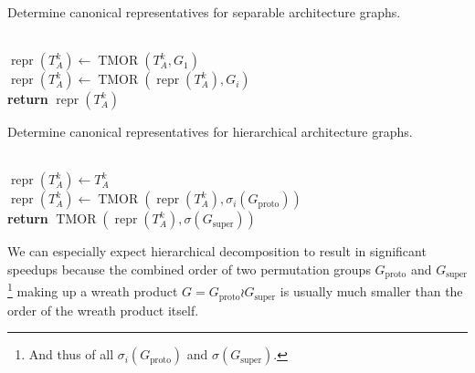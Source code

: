 \begin{algorithm}
  \caption{Determine canonical representatives for separable architecture graphs.}
  \label{alg:task_repr_direct_prod}
  \begin{algorithmic}[1]
    \\
    \State $\operatorname{repr}(T_A^k) \gets
           \operatorname{TMOR}(T_A^k, G_1)$
    \\
      \State $\operatorname{repr}(T_A^k) \gets
             \operatorname{TMOR}(\operatorname{repr}(T_A^k), G_i)$
    \EndFor
    \\
    \State \textbf{return} $\operatorname{repr}(T_A^k)$
  \EndProcedure
  \end{algorithmic}
\end{algorithm}

\begin{algorithm}
  \caption{Determine canonical representatives for hierarchical architecture graphs.}
  \label{alg:task_repr_wreath_prod}
  \begin{algorithmic}[1]

    \\
    \State $\operatorname{repr}(T_A^k) \gets T_A^k$
    \\
      \State $\operatorname{repr}(T_A^k) \gets
                \operatorname{TMOR}(
                  \operatorname{repr}(T_A^k),
                  \sigma_i(G_{\operatorname{proto}}))$
    \EndFor
    \\
    \State \textbf{return} $\operatorname{TMOR}(
                              \operatorname{repr}(T_A^k),
                              \sigma(G_{\operatorname{super}}))$
  \EndProcedure
  \end{algorithmic}
\end{algorithm}

We can especially expect hierarchical decomposition to result in significant
speedups because the combined order of two permutation groups
$G_{\mathrm{proto}}$ and $G_{\mathrm{super}}$\footnote{And thus of all
$\sigma_i(G_{\mathrm{proto}})$ and $\sigma(G_{\mathrm{super}})$.} making up a
wreath product $G = G_{\mathrm{proto}} \wr G_{\mathrm{super}}$ is usually much
smaller than the order of the wreath product itself.
